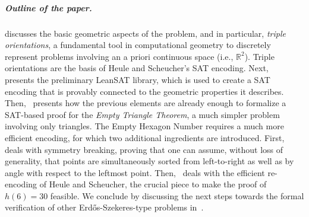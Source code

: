 \subparagraph*{Outline of the paper.}  discusses the basic geometric aspects of the problem, and in particular, \emph{triple orientations}, a fundamental tool in computational geometry to discretely represent problems involving an a priori continuous space (i.e., $\mathbb{R}^2$). Triple orientations are the basis of Heule and Scheucher's SAT encoding.
Next,~ presents the preliminary \textsf{LeanSAT} library, which is used to create a SAT encoding that is provably connected to the geometric properties it describes.
Then,~ presents how the previous elements are already enough to formalize a SAT-based proof for the \emph{Empty Triangle Theorem}, a much simpler problem involving only triangles.
The Empty Hexagon Number requires a much more efficient encoding, for which two additional ingredients are introduced. First,~ deals with symmetry breaking, proving that one can assume, without loss of generality, that points are simultaneously sorted from left-to-right as well as by angle with respect to the leftmost point. 
Then,~ deals with the efficient re-encoding of Heule and Scheucher, the crucial piece to make the proof of $h(6) = 30$ feasible. We conclude by discussing the next steps towards the formal verification of other Erd\H{o}s-Szekeres-type problems in~.

